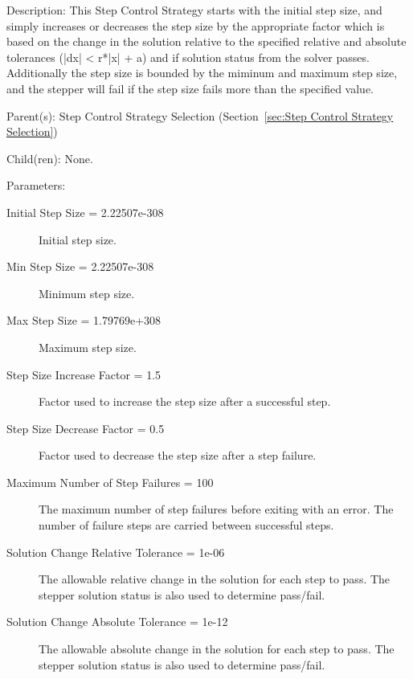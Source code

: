 \begin{list}{}
  {\setlength{\leftmargin}{1.0in}
   \setlength{\labelwidth}{0.75in}
   \setlength{\labelsep}{0.125in}}
  \item[Description:]
    This Step Control Strategy starts with the initial step size, and simply increases or decreases the step size by the appropriate factor which is based on the change in the solution relative to the specified relative and absolute tolerances (|dx| < r*|x| + a) and if solution status from the solver passes.  Additionally the step size is bounded by the miminum and maximum step size, and the stepper will fail if the step size fails more than the specified value.
  \item[Parent(s):]
    Step Control Strategy Selection (Section~\ref{sec:Step Control Strategy Selection})
  \item[Child(ren):]
    None. 
  \item[Parameters:]
    \begin{description}
      \item[Initial Step Size = 2.22507e-308] 
Initial step size.
      \item[Min Step Size = 2.22507e-308] 
Minimum step size.
      \item[Max Step Size = 1.79769e+308] 
Maximum step size.
      \item[Step Size Increase Factor = 1.5] 
Factor used to increase the step size after a successful step.
      \item[Step Size Decrease Factor = 0.5] 
Factor used to decrease the step size after a step failure.
      \item[Maximum Number of Step Failures = 100] 
The maximum number of step failures before exiting with an error.  The number of failure steps are carried between successful steps.
      \item[Solution Change Relative Tolerance = 1e-06] 
The allowable relative change in the solution for each step to pass.  The stepper solution status is also used to determine pass/fail.
      \item[Solution Change Absolute Tolerance = 1e-12] 
The allowable absolute change in the solution for each step to pass.  The stepper solution status is also used to determine pass/fail.
\end{description}


\end{list}
